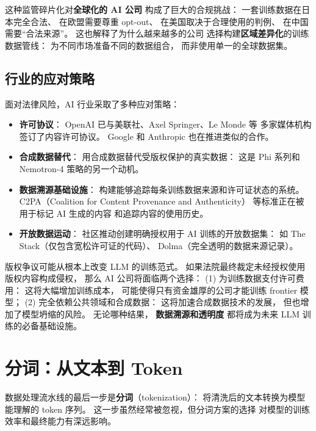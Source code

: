 这种监管碎片化对\textbf{全球化的 AI 公司}
构成了巨大的合规挑战：
一套训练数据在日本完全合法、
在欧盟需要尊重 opt-out、
在美国取决于合理使用的判例、
在中国需要“合法来源”。
这也解释了为什么越来越多的公司
选择构建\textbf{区域差异化}的训练数据管线：
为不同市场准备不同的数据组合，
而非使用单一的全球数据集。

\subsection{行业的应对策略}

面对法律风险，AI 行业采取了多种应对策略：

\begin{itemize}[noitemsep]
  \item \textbf{许可协议}：
        OpenAI 已与美联社、Axel Springer、Le Monde 等
        多家媒体机构签订了内容许可协议。
        Google 和 Anthropic 也在推进类似的合作。
  \item \textbf{合成数据替代}：
        用合成数据替代受版权保护的真实数据：
        这是 Phi 系列和 Nemotron-4 策略的另一个动机。
  \item \textbf{数据溯源基础设施}：
        构建能够追踪每条训练数据来源和许可证状态的系统。
        C2PA（Coalition for Content Provenance and Authenticity）
        等标准正在被用于标记 AI 生成的内容
        和追踪内容的使用历史。
  \item \textbf{开放数据运动}：
        社区推动创建明确授权用于 AI 训练的开放数据集：
        如 The Stack（仅包含宽松许可证的代码）、
        Dolma（完全透明的数据来源记录）。
\end{itemize}

\begin{corebox}[版权问题的长期影响]
版权争议可能从根本上改变 LLM 的训练范式。
如果法院最终裁定未经授权使用版权内容构成侵权，
那么 AI 公司将面临两个选择：
(1) 为训练数据支付许可费用：
这将大幅增加训练成本，
可能使得只有资金雄厚的公司才能训练 frontier 模型；
(2) 完全依赖公共领域和合成数据：
这将加速合成数据技术的发展，
但也增加了模型坍缩的风险。
无论哪种结果，
\textbf{数据溯源和透明度}
都将成为未来 LLM 训练的必备基础设施。
\end{corebox}

\section{分词：从文本到 Token}

数据处理流水线的最后一步是\textbf{分词}（tokenization）：
将清洗后的文本转换为模型能理解的 token 序列。
这一步虽然经常被忽视，但分词方案的选择
对模型的训练效率和最终能力有深远影响。

